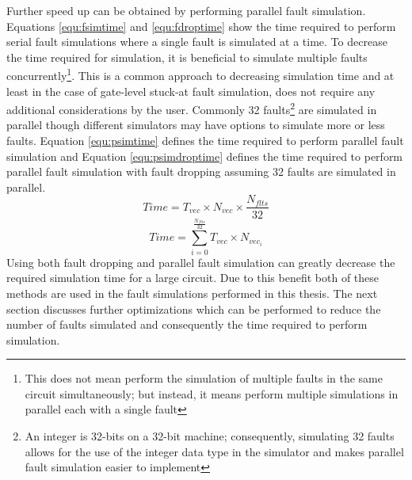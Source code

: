 \documentclass[12pt]{report}
\begin{document}
Further speed up can be obtained by performing parallel fault simulation.  Equations \ref{equ:fsimtime} and \ref{equ:fdroptime} show the time required to perform serial fault simulations where a single fault is simulated at a time.  To decrease the time required for simulation, it is beneficial to simulate multiple faults concurrently\footnote{This does not mean perform the simulation of multiple faults in the same circuit simultaneously; but instead, it means perform multiple simulations in parallel each with a single fault\cite{parallelflts}}. This is a common approach to decreasing simulation time and at least in the case of gate-level stuck-at fault simulation, does not require any additional considerations by the user\cite{parallelflts}.  Commonly 32 faults\footnote{An integer is 32-bits on a 32-bit machine; consequently, simulating 32 faults allows for the use of the integer data type in the simulator and makes parallel fault simulation easier to implement\cite{parallelflts}} are simulated in parallel though different simulators may have options to simulate more or less faults\cite{parallelflts}.  Equation \ref{equ:psimtime} defines the time required to perform parallel fault simulation and Equation \ref{equ:psimdroptime} defines the time required to perform parallel fault simulation with fault dropping\cite{needed-pfsimtime} assuming 32 faults are simulated in parallel. 
\begin{equation}
Time = T_{vec} \times N_{vec} \times \frac{N_{flts}}{32}
\label{equ:psimtime}
\end{equation}
\begin{equation}
Time =  \sum_{i=0}^{\frac{N_{flts}}{32}} T_{vec} \times N_{vec_i}
\label{equ:psimdroptime}
\end{equation}
Using both fault dropping and parallel fault simulation can greatly decrease the required simulation time for a large circuit.  Due to this benefit both of these methods are used in the fault simulations performed in this thesis.  The next section discusses further optimizations which can be performed to reduce the number of faults simulated and consequently the time required to perform simulation.
\end{document}
